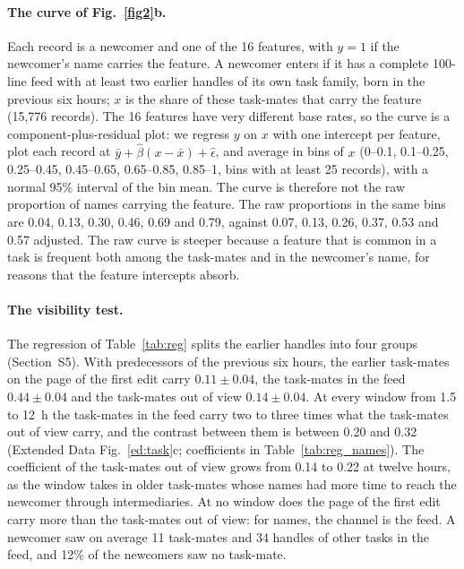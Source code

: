 \documentclass[10pt]{article}
\begin{document}
\paragraph{The curve of Fig.~\ref{fig2}b.} Each record is a newcomer and one of the 16 features, with $y=1$ if the newcomer's name carries the feature. A newcomer enters if it has a complete 100-line feed with at least two earlier handles of its own task family, born in the previous six hours; $x$ is the share of these task-mates that carry the feature (15,776 records). The 16 features have very different base rates, so the curve is a component-plus-residual plot: we regress $y$ on $x$ with one intercept per feature, plot each record at $\bar y+\hat\beta(x-\bar x)+\hat\epsilon$, and average in bins of $x$ (0--0.1, 0.1--0.25, 0.25--0.45, 0.45--0.65, 0.65--0.85, 0.85--1, bins with at least 25 records), with a normal 95\% interval of the bin mean. The curve is therefore not the raw proportion of names carrying the feature. The raw proportions in the same bins are 0.04, 0.13, 0.30, 0.46, 0.69 and 0.79, against 0.07, 0.13, 0.26, 0.37, 0.53 and 0.57 adjusted. The raw curve is steeper because a feature that is common in a task is frequent both among the task-mates and in the newcomer's name, for reasons that the feature intercepts absorb.

\paragraph{The visibility test.} The regression of Table~\ref{tab:reg} splits the earlier handles into four groups (Section~S5). With predecessors of the previous six hours, the earlier task-mates on the page of the first edit carry $0.11 \pm 0.04$, the task-mates in the feed $0.44 \pm 0.04$ and the task-mates out of view $0.14 \pm 0.04$. At every window from 1.5 to 12~h the task-mates in the feed carry two to three times what the task-mates out of view carry, and the contrast between them is between 0.20 and 0.32 (Extended Data Fig.~\ref{ed:task}c; coefficients in Table~\ref{tab:reg_names}). The coefficient of the task-mates out of view grows from 0.14 to 0.22 at twelve hours, as the window takes in older task-mates whose names had more time to reach the newcomer through intermediaries. At no window does the page of the first edit carry more than the task-mates out of view: for names, the channel is the feed. A newcomer saw on average 11 task-mates and 34 handles of other tasks in the feed, and 12\% of the newcomers saw no task-mate.
\end{document}

